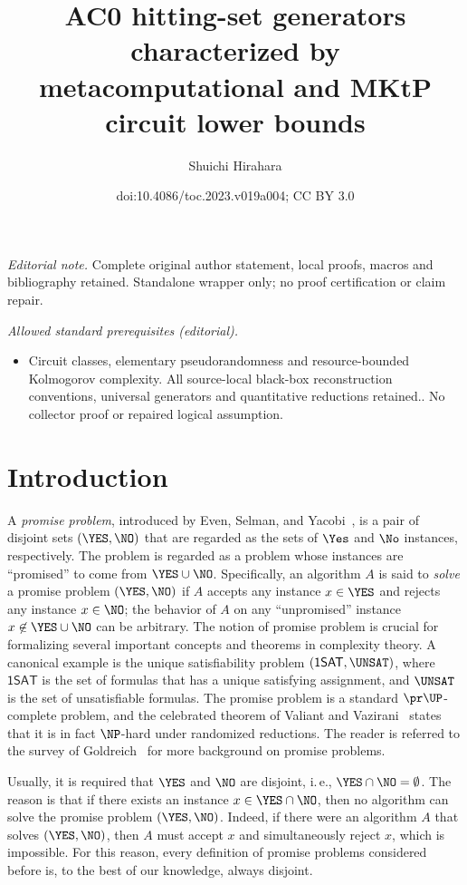 \documentclass[11pt]{article}
\title{AC0 hitting-set generators characterized by metacomputational and MKtP circuit lower bounds}
\author{Shuichi Hirahara}
\date{doi:10.4086/toc.2023.v019a004; CC BY 3.0}
\numberwithin{equation}{section}
\theoremstyle{definition}
\theoremstyle{plain}
\newcommand{\ie}{i.\,e.}
\begin{document}
\maketitle
\noindent\textit{Editorial note.} Complete original author statement, local proofs, macros and bibliography retained. Standalone wrapper only; no proof certification or claim repair.\par\medskip
\noindent\textit{Allowed standard prerequisites (editorial).}\begin{itemize}
\item Circuit classes, elementary pseudorandomness and resource-bounded Kolmogorov complexity. All source-local black-box reconstruction conventions, universal generators and quantitative reductions retained.. No collector proof or repaired logical assumption.
\end{itemize}\medskip
\section{Introduction}
\label{section_introduction}


A \emph{promise problem}, introduced by Even, Selman, and Yacobi~\cite{EvenSY84_iandc_journals},
is a pair of disjoint sets $(\YES, \NO)$ that are regarded as the sets of $\Yes$ and $\No$ instances, respectively.
The problem is regarded as a problem whose instances are ``promised'' to come from $\YES \cup \NO$.
Specifically,
an algorithm $A$ is said to \emph{solve} a promise problem $(\YES, \NO)$
if
$A$ accepts any instance $x \in \YES$ and rejects any instance $x \in \NO$;
the behavior of $A$ on any ``unpromised'' instance $x \not\in \YES \cup \NO$ can be arbitrary.
The notion of promise problem is crucial for formalizing several important concepts and theorems in complexity theory.
A canonical example is the unique satisfiability problem $(\mathsf{1SAT}, \UNSAT)$, where $\mathsf{1SAT}$ is the set of formulas that has a unique satisfying assignment, and $\UNSAT$ is the set of unsatisfiable formulas.
%
%
The promise problem is a standard $\pr\UP$-complete problem, and
the celebrated theorem of Valiant and Vazirani~\cite{ValiantV86_tcs_journals}
states that it is in fact $\NP$-hard under randomized reductions.
The reader is referred to the survey of Goldreich~\cite{Goldreich06a_birthday_conf} for more background on promise problems.

Usually, it is required that $\YES$ and $\NO$ are disjoint, \ie, $\YES \cap \NO = \emptyset$.
The reason is that if there exists an instance $x \in \YES \cap \NO$,
then
no algorithm can solve the promise problem $(\YES, \NO)$.
Indeed, if there were an algorithm $A$ that solves $(\YES, \NO)$,
then
$A$ must accept $x$ and simultaneously reject $x$, which is impossible.
For this reason,
every definition of promise problems considered before
is, to the best of our knowledge,
always disjoint.
\end{document}
